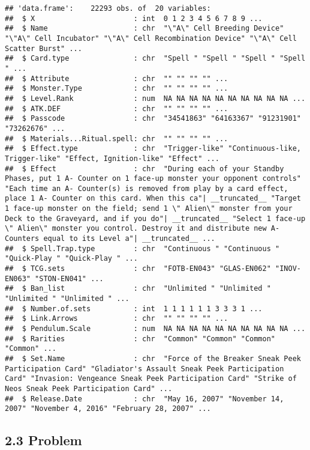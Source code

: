 \documentclass[
]{article}
\begin{document}
\begin{verbatim}
## 'data.frame':    22293 obs. of  20 variables:
##  $ X                       : int  0 1 2 3 4 5 6 7 8 9 ...
##  $ Name                    : chr  "\"A\" Cell Breeding Device" "\"A\" Cell Incubator" "\"A\" Cell Recombination Device" "\"A\" Cell Scatter Burst" ...
##  $ Card.type               : chr  "Spell " "Spell " "Spell " "Spell " ...
##  $ Attribute               : chr  "" "" "" "" ...
##  $ Monster.Type            : chr  "" "" "" "" ...
##  $ Level.Rank              : num  NA NA NA NA NA NA NA NA NA NA ...
##  $ ATK.DEF                 : chr  "" "" "" "" ...
##  $ Passcode                : chr  "34541863" "64163367" "91231901" "73262676" ...
##  $ Materials...Ritual.spell: chr  "" "" "" "" ...
##  $ Effect.type             : chr  "Trigger-like" "Continuous-like, Trigger-like" "Effect, Ignition-like" "Effect" ...
##  $ Effect                  : chr  "During each of your Standby Phases, put 1 A- Counter on 1 face-up monster your opponent controls" "Each time an A- Counter(s) is removed from play by a card effect, place 1 A- Counter on this card. When this ca"| __truncated__ "Target 1 face-up monster on the field; send 1 \" Alien\" monster from your Deck to the Graveyard, and if you do"| __truncated__ "Select 1 face-up \" Alien\" monster you control. Destroy it and distribute new A- Counters equal to its Level a"| __truncated__ ...
##  $ Spell.Trap.type         : chr  "Continuous " "Continuous " "Quick-Play " "Quick-Play " ...
##  $ TCG.sets                : chr  "FOTB-EN043" "GLAS-EN062" "INOV-EN063" "STON-EN041" ...
##  $ Ban_list                : chr  "Unlimited " "Unlimited " "Unlimited " "Unlimited " ...
##  $ Number.of.sets          : int  1 1 1 1 1 1 3 3 3 1 ...
##  $ Link.Arrows             : chr  "" "" "" "" ...
##  $ Pendulum.Scale          : num  NA NA NA NA NA NA NA NA NA NA ...
##  $ Rarities                : chr  "Common" "Common" "Common" "Common" ...
##  $ Set.Name                : chr  "Force of the Breaker Sneak Peek Participation Card" "Gladiator's Assault Sneak Peek Participation Card" "Invasion: Vengeance Sneak Peek Participation Card" "Strike of Neos Sneak Peek Participation Card" ...
##  $ Release.Date            : chr  "May 16, 2007" "November 14, 2007" "November 4, 2016" "February 28, 2007" ...
\end{verbatim}

\hypertarget{problem}{%
\subsection{2.3 Problem}\label{problem}}
\end{document}
